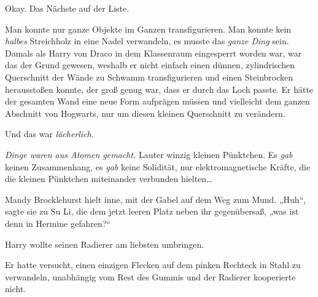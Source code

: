 Okay. Das Nächste auf der Liste.

Man konnte nur ganze Objekte im Ganzen transfigurieren. Man konnte kein \emph{halbes} Streichholz in eine Nadel verwandeln, es musste das \emph{ganze Ding} sein. Damals als Harry von Draco in dem Klassenraum eingesperrt worden war, war das der Grund gewesen, weshalb er nicht einfach einen dünnen, zylindrischen Querschnitt der Wände zu Schwamm transfigurieren und einen Steinbrocken herausstoßen konnte, der groß genug war, dass er durch das Loch passte. Er hätte der gesamten Wand eine neue Form aufprägen müssen und vielleicht dem ganzen Abschnitt von Hogwarts, nur um diesen kleinen Querschnitt zu verändern.

Und das war \emph{lächerlich}.

\emph{Dinge waren aus Atomen gemacht.} Lauter winzig kleinen Pünktchen. Es \emph{gab} keinen Zusammenhang, es \emph{gab} keine Solidität, nur elektromagnetische Kräfte, die die kleinen Pünktchen miteinander verbunden hielten…

\later

Mandy Brocklehurst hielt inne, mit der Gabel auf dem Weg zum Mund. „Huh“, sagte sie zu Su Li, die dem jetzt leeren Platz neben ihr gegenübersaß, „was ist denn in Hermine gefahren?“

\later

Harry wollte seinen Radierer am liebsten umbringen.

Er hatte versucht, einen einzigen Flecken auf dem pinken Rechteck in Stahl zu verwandeln, unabhängig vom Rest des Gummis und der Radierer kooperierte nicht.

